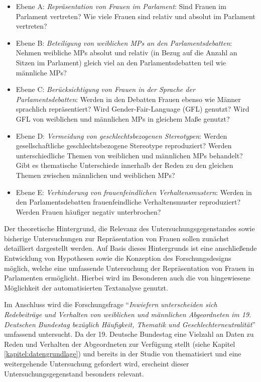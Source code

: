 \documentclass[12pt, 
    twoside=false, 
    bibliography=totoc, 
    numbers=endperiod, 
    headings=normal, 
    toc=chapterentrydotfill
    ]{scrbook}
\begin{document}
\begin{itemize}
    \item Ebene A: \emph{Repräsentation von Frauen im Parlament}: Sind Frauen im Parlament vertreten? Wie viele Frauen sind relativ und absolut im Parlament vertreten? 
    \item Ebene B: \emph{Beteiligung von weiblichen MPs an den Parlamentsdebatten}: Nehmen weibliche MPs absolut und relativ (in Bezug auf die Anzahl an Sitzen im Parlament) gleich viel an den Parlamentsdebatten teil wie männliche MPs? 
    \item Ebene C: \emph{Berücksichtigung von Frauen in der Sprache der Parlamentsdebatten}: Werden in den Debatten Frauen ebenso wie Männer sprachlich repräsentiert? Wird Gender-Fair-Language (GFL) genutzt? Wird GFL von weiblichen und männlichen MPs in gleichem Maße genutzt? 
    \item Ebene D: \emph{Vermeidung von geschlechtsbezogenen Stereotypen}: Werden gesellschaftliche geschlechtsbezogene Stereotype reproduziert? Werden unterschiedliche Themen von weiblichen und männlichen MPs behandelt? Gibt es thematische Unterschiede innerhalb der Reden zu den gleichen Themen zwischen männlichen und weiblichen MPs? 
    \item Ebene E: \emph{Verhinderung von frauenfeindlichen Verhaltensmustern}: Werden in den Parlamentsdebatten frauenfeindliche Verhaltensmuster reproduziert? Werden Frauen häufiger negativ unterbrochen? 
    
\end{itemize}

Der theoretische Hintergrund, die Relevanz des Untersuchungsgegenstandes sowie bisherige Untersuchungen zur Repräsentation von Frauen sollen zunächst detailliert dargestellt werden. Auf Basis dieses Hintergrunds ist eine anschließende Entwicklung von Hypothesen sowie die Konzeption des Forschungsdesigns möglich, welche eine umfassende Untersuchung der Repräsentation von Frauen in Parlamenten ermöglicht. Hierbei wird im Besonderen auch die von \textcite[18]{back_2018} hingewiesene Möglichkeit der automatisierten Textanalyse genutzt.

Im Anschluss wird die Forschungsfrage \enquote{\emph{Inwiefern unterscheiden sich Redebeiträge und Verhalten von weiblichen und männlichen Abgeordneten im 19. Deutschen Bundestag bezüglich Häufigkeit, Thematik und Geschlechterneutralität}} umfassend untersucht. Da der 19. Deutsche Bundestag eine Vielzahl an Daten zu Reden und Verhalten der Abgeordneten zur Verfügung stellt (siehe Kapitel \ref{kapitel:datengrundlage}) und bereits in der Studie von \textcite{back_2018} thematisiert und eine weitergehende Untersuchung gefordert wird, erscheint dieser Untersuchungsgegenstand besonders relevant.
\end{document}
